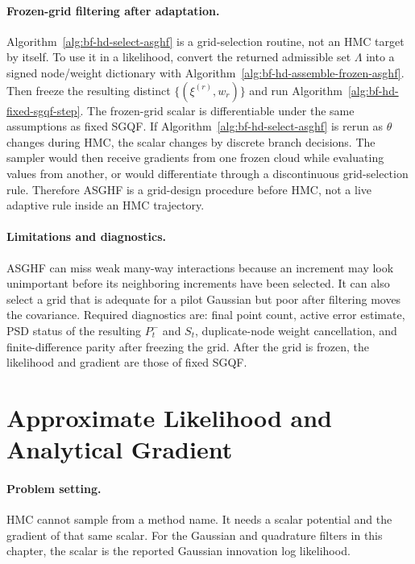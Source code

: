 \paragraph{Frozen-grid filtering after adaptation.}
Algorithm~\ref{alg:bf-hd-select-asghf} is a grid-selection routine, not an HMC
target by itself.  To use it in a likelihood, convert the returned admissible
set \(\Lambda\) into a signed node/weight dictionary with
Algorithm~\ref{alg:bf-hd-assemble-frozen-asghf}.  Then freeze the resulting
distinct \(\{(\xi^{(r)},w_r)\}\) and run
Algorithm~\ref{alg:bf-hd-fixed-sgqf-step}.  The frozen-grid scalar is
differentiable under the same assumptions as fixed SGQF.  If
Algorithm~\ref{alg:bf-hd-select-asghf} is rerun as \(\theta\) changes during
HMC, the scalar changes by discrete branch decisions.  The sampler would then
receive gradients from one frozen cloud while evaluating values from another,
or would differentiate through a discontinuous grid-selection rule.  Therefore
ASGHF is a grid-design procedure before HMC, not a live adaptive rule inside an
HMC trajectory.

\paragraph{Limitations and diagnostics.}
ASGHF can miss weak many-way interactions because an increment may look
unimportant before its neighboring increments have been selected.  It can also
select a grid that is adequate for a pilot Gaussian but poor after filtering
moves the covariance.  Required diagnostics are: final point count, active error
estimate, PSD status of the resulting \(P_t^-\) and \(S_t\), duplicate-node
weight cancellation, and finite-difference parity after freezing the grid.
After the grid is frozen, the likelihood and gradient are those of fixed SGQF.

\section{Approximate Likelihood and Analytical Gradient}
\label{sec:bf-hd-gq-gradient-contract}

\paragraph{Problem setting.}
HMC cannot sample from a method name.  It needs a scalar potential and the
gradient of that same scalar.  For the Gaussian and quadrature filters in this
chapter, the scalar is the reported Gaussian innovation log likelihood.


